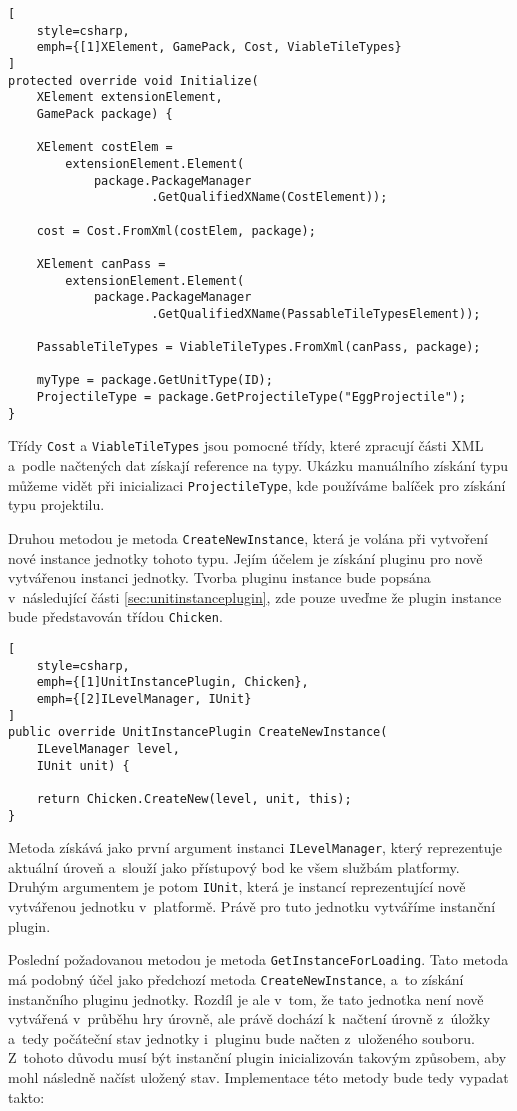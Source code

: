 \begin{lstlisting}[
	style=csharp,
	emph={[1]XElement, GamePack, Cost, ViableTileTypes}
]
protected override void Initialize(
	XElement extensionElement, 
	GamePack package) {
	
	XElement costElem =
		extensionElement.Element(
			package.PackageManager
			   	    .GetQualifiedXName(CostElement));
			   
	cost = Cost.FromXml(costElem, package);

	XElement canPass =
		extensionElement.Element(
			package.PackageManager
			   	    .GetQualifiedXName(PassableTileTypesElement));
			   
	PassableTileTypes = ViableTileTypes.FromXml(canPass, package);

	myType = package.GetUnitType(ID);
	ProjectileType = package.GetProjectileType("EggProjectile");
}
\end{lstlisting}

Třídy \texttt{Cost} a \texttt{ViableTileTypes} jsou pomocné třídy, které zpracují části XML a~podle načtených dat získají reference na typy. Ukázku manuálního získání typu můžeme vidět při inicializaci \texttt{ProjectileType}, kde používáme balíček pro získání typu projektilu.


Druhou metodou je metoda \texttt{CreateNewInstance}, která je volána při vytvoření nové instance jednotky tohoto typu. Jejím účelem je získání pluginu pro nově vytvářenou instanci jednotky. Tvorba pluginu instance bude popsána v~následující části \ref{sec:unitinstanceplugin}, zde pouze uveďme že plugin instance bude představován třídou \texttt{Chicken}.


\begin{lstlisting}[
	style=csharp,
	emph={[1]UnitInstancePlugin, Chicken},
	emph={[2]ILevelManager, IUnit}
]
public override UnitInstancePlugin CreateNewInstance(
	ILevelManager level, 
	IUnit unit) {
	
	return Chicken.CreateNew(level, unit, this);
}
\end{lstlisting}
Metoda získává jako první argument instanci \texttt{ILevelManager}, který reprezentuje aktuální úroveň a~slouží jako přístupový bod ke všem službám platformy. Druhým argumentem je potom \texttt{IUnit}, která je instancí reprezentující nově vytvářenou jednotku v~platformě. Právě pro tuto jednotku vytváříme instanční plugin.


Poslední požadovanou metodou je metoda \texttt{GetInstanceForLoading}. Tato metoda má podobný účel jako předchozí metoda \texttt{CreateNewInstance}, a~to získání instančního pluginu jednotky. Rozdíl je ale v~tom, že tato jednotka není nově vytvářená v~průběhu hry úrovně, ale právě dochází k~načtení úrovně z~úložky a~tedy počáteční stav jednotky i~pluginu bude načten z~uloženého souboru. Z~tohoto důvodu musí být instanční plugin inicializován takovým způsobem, aby mohl následně načíst uložený stav. Implementace této metody bude tedy vypadat takto:

